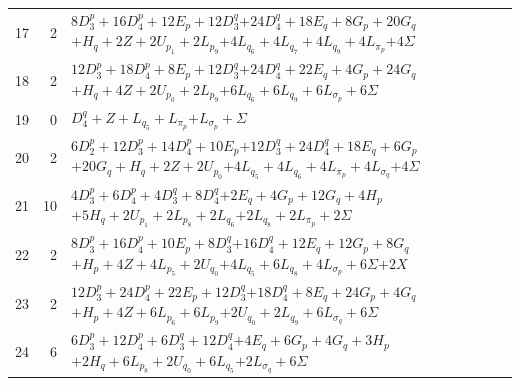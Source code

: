 \documentclass[11pt,a4paper]{article}
\theoremstyle{remark}
\begin{document}
\begin{longtable}{rrp{12.7cm}}
17&2&\( 8D_3^p + 16D_4^p + 12E_p + 12D_3^q \)\newline\( + 24D_4^q + 18E_q + 8G_p + 20G_q \)\newline\( + H_q + 2Z + 2U_{p_{1}} + 2L_{p_{9}} \)\newline\( + 4L_{q_{6}} + 4L_{q_{7}} + 4L_{q_{9}} + 4L_{\pi_p} \)\newline\( + 4\Sigma \)\\[3pt]
18&2&\( 12D_3^p + 18D_4^p + 8E_p + 12D_3^q \)\newline\( + 24D_4^q + 22E_q + 4G_p + 24G_q \)\newline\( + H_q + 4Z + 2U_{p_{0}} + 2L_{p_{9}} \)\newline\( + 6L_{q_{6}} + 6L_{q_{9}} + 6L_{\sigma_p} + 6\Sigma \)\\[3pt]
19&0&\( D_4^q + Z + L_{q_{5}} + L_{\pi_p} \)\newline\( + L_{\sigma_p} + \Sigma \)\\[3pt]
20&2&\( 6D_2^p + 12D_3^p + 14D_4^p + 10E_p \)\newline\( + 12D_3^q + 24D_4^q + 18E_q + 6G_p \)\newline\( + 20G_q + H_q + 2Z + 2U_{p_{0}} \)\newline\( + 4L_{q_{5}} + 4L_{q_{6}} + 4L_{\pi_p} + 4L_{\sigma_q} \)\newline\( + 4\Sigma \)\\[3pt]
21&10&\( 4D_3^p + 6D_4^p + 4D_3^q + 8D_4^q \)\newline\( + 2E_q + 4G_p + 12G_q + 4H_p \)\newline\( + 5H_q + 2U_{p_{1}} + 2L_{p_{8}} + 2L_{q_{6}} \)\newline\( + 2L_{q_{8}} + 2L_{\pi_p} + 2\Sigma \)\\[3pt]
22&2&\( 8D_3^p + 16D_4^p + 10E_p + 8D_3^q \)\newline\( + 16D_4^q + 12E_q + 12G_p + 8G_q \)\newline\( + H_p + 4Z + 4L_{p_{5}} + 2U_{q_{0}} \)\newline\( + 4L_{q_{5}} + 6L_{q_{8}} + 4L_{\sigma_p} + 6\Sigma \)\newline\( + 2X \)\\[3pt]
23&2&\( 12D_3^p + 24D_4^p + 22E_p + 12D_3^q \)\newline\( + 18D_4^q + 8E_q + 24G_p + 4G_q \)\newline\( + H_p + 4Z + 6L_{p_{6}} + 6L_{p_{9}} \)\newline\( + 2U_{q_{0}} + 2L_{q_{9}} + 6L_{\sigma_q} + 6\Sigma \)\\[3pt]
24&6&\( 6D_3^p + 12D_4^p + 6D_3^q + 12D_4^q \)\newline\( + 4E_q + 6G_p + 4G_q + 3H_p \)\newline\( + 2H_q + 6L_{p_{8}} + 2U_{q_{0}} + 6L_{q_{5}} \)\newline\( + 2L_{\sigma_q} + 6\Sigma \)\\[3pt]

\end{longtable}
\end{document}
